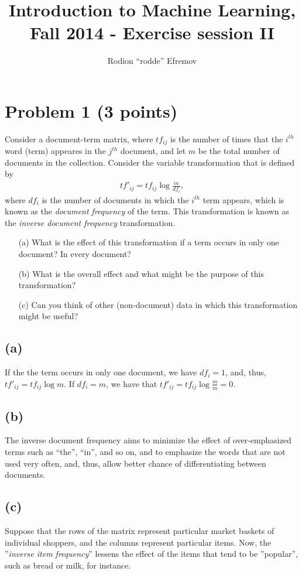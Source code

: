 \documentclass[10pt]{article}
\title{Introduction to Machine Learning, Fall 2014 - Exercise session II}
\author{Rodion ``rodde'' Efremov}
\begin{document}
 \maketitle

\color{blue}
\section*{Problem 1 (3 points)}
Consider a document-term matrix, where $tf_{ij}$ is the number of times that the $i^{th}$ word (term) appeares in the $j^{th}$ document, and let $m$ be the total number of documents in the collection. Consider the variable transformation that is defined by
\begin{align}
tf'_{ij} = tf_{ij} \log \frac{m}{df_i},
\end{align}
where $df_i$ is the number of documents in which the $i^{th}$ term appears, which is known as the \textit{document frequency} of the term. This transformation is known as the \textit{inverse document frequency} transformation.
\begin{itemize}
\item[(a)] What is the effect of this transformation if a term occurs in only one document? In every document?
\item[(b)] What is the overall effect and what might be the purpose of this transformation?
\item[(c)] Can you think of other (non-document) data in which this transformation might be useful?
\end{itemize}

\color{black}
\subsection*{(a)}
If the the term occurs in only one document, we have $df_i = 1$, and, thus, $tf'_{ij} = tf_{ij}\log m$. If $df_i = m$, we have that $tf'_{ij} = tf_{ij}\log \frac{m}{m} = 0$.

\subsection*{(b)}
The inverse document frequency aims to minimize the effect of over-emphasized terms such as ``the'', ``in'', and so on, and to emphasize the words that are not used very often, and, thus, allow better chance of differentiating between documents.

\subsection*{(c)}
Suppose that the rows of the matrix represent particular market baskets of individual shoppers, and the columns represent particular items. Now, the ''\textit{inverse item frequency}'' lessens the effect of the items that tend to be ''popular'', such as bread or milk, for instance.
\end{document}
